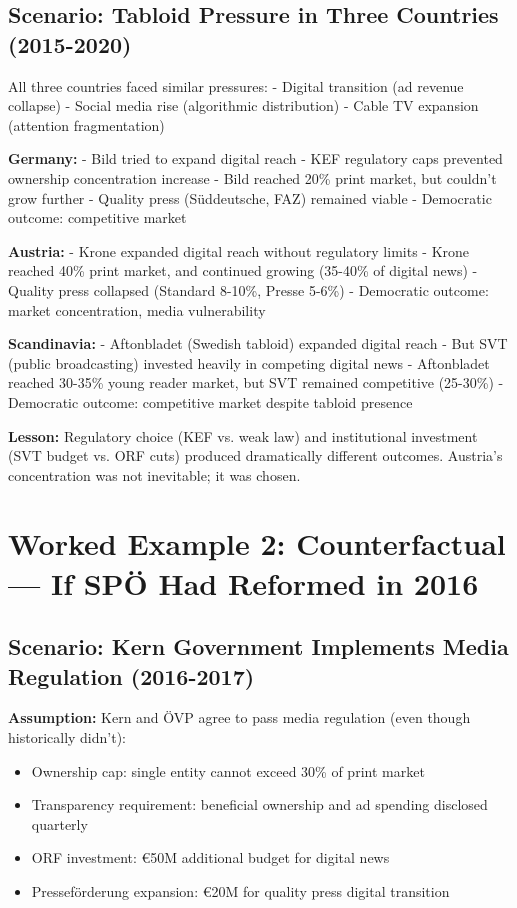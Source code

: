 {\subsection*{Scenario: Tabloid Pressure in Three Countries (2015-2020)}

All three countries faced similar pressures:
- Digital transition (ad revenue collapse)
- Social media rise (algorithmic distribution)
- Cable TV expansion (attention fragmentation)

\textbf{Germany:}
- Bild tried to expand digital reach
- KEF regulatory caps prevented ownership concentration increase
- Bild reached 20\% print market, but couldn't grow further
- Quality press (Süddeutsche, FAZ) remained viable
- Democratic outcome: competitive market

\textbf{Austria:}
- Krone expanded digital reach without regulatory limits
- Krone reached 40\% print market, and continued growing (35-40\% of digital news)
- Quality press collapsed (Standard 8-10\%, Presse 5-6\%)
- Democratic outcome: market concentration, media vulnerability

\textbf{Scandinavia:}
- Aftonbladet (Swedish tabloid) expanded digital reach
- But SVT (public broadcasting) invested heavily in competing digital news
- Aftonbladet reached 30-35\% young reader market, but SVT remained competitive (25-30\%)
- Democratic outcome: competitive market despite tabloid presence

\textbf{Lesson:} Regulatory choice (KEF vs. weak law) and institutional investment (SVT budget vs. ORF cuts)
produced dramatically different outcomes. Austria's concentration was not inevitable; it was chosen.


\section*{Worked Example 2: Counterfactual --- If SPÖ Had Reformed in 2016}

\subsection*{Scenario: Kern Government Implements Media Regulation (2016-2017)}

\textbf{Assumption:} Kern and ÖVP agree to pass media regulation (even though historically didn't):
\begin{itemize}
\item Ownership cap: single entity cannot exceed 30\% of print market
\item Transparency requirement: beneficial ownership and ad spending disclosed quarterly
\item ORF investment: €50M additional budget for digital news
\item Presseförderung expansion: €20M for quality press digital transition
\end{itemize}

}

